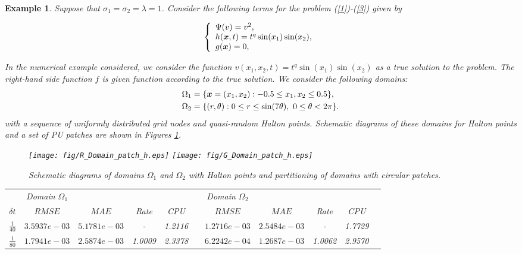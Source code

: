 \documentclass[9pt]{article}
\newtheorem{example}[theorem]{Example}
\numberwithin{equation}{section}
\def\bfm#1{\protect{\makebox{\boldmath $#1$}}}
\def\x {\bfm{x}}
\begin{document}
\begin{example}
Suppose that $\sigma_1=\sigma_2=\lambda=1$. Consider the following terms for the problem (\ref{1})-(\ref{3}) given by
\begin{small}
\begin{eqnarray}%
\left\{ {\begin{array}{ll}
\Psi(v)=v^2,\\
h(\x,t)=t^{q}\sin(x_1)\sin(x_2),\\
g(\x)=0,
\end{array} } \right.\nonumber
 \end{eqnarray}
 \end{small}
In the numerical example considered, we consider the function $v(x_1,x_2,t)=t^{q}\sin(x_1)\sin(x_2)$ as a true solution to the problem. The right-hand side function $f$ is given function according to the true solution. We consider the following domains:
\begin{align*}\label{D1}
\Omega_{1}&=\lbrace \x=(x_{1},x_{2}):-0.5\leq x_{1},x_{2}\leq 0.5\rbrace,\\
\Omega_{2}&=\lbrace (r,\theta):0\leq r\leq \sin (7\theta), ~0 \leq \theta <2\pi\rbrace.\nonumber
\end{align*}
with a sequence of uniformly distributed grid nodes and quasi-random Halton points.
Schematic diagrams of these domains for Halton points and a set of PU patches are shown in Figures \ref{fig_dom}.
\begin{figure}[!h]
\centering
\texttt{[image: fig/R\_Domain\_patch\_h.eps]}
\texttt{[image: fig/G\_Domain\_patch\_h.eps]}
\caption{Schematic diagrams of domains $\Omega_1$ and $\Omega_2$ with Halton points and partitioning of domains with circular patches.}\label{fig_dom}
\end{figure}
\begin{table}[!h]
\centering
\begin{tabular}{ c | c c c c c c c c c c}
  \hline
 &{Domain $\Omega_1$} & & & & & { Domain $\Omega_2$}& &&\\
  \cline{2-4} \cline{7-9}
{$\delta t$} & {$RMSE$} & {$MAE$} & {Rate}  & {CPU}&& {$RMSE$} & {$MAE$} & {Rate} & {CPU} \\ \hline
{$\frac{1}{40}$} & {$3.5937e-03$} & {$5.1781e-03$} & {-}  & {1.2116}&& {$1.2716e-03$} & {$2.5484e-03$} & {-}  & {1.7729}\\ 
{$\frac{1}{80}$} & {$1.7941e-03$} & {$2.5874e-03$} & {1.0009}  & {2.3378}&& {$6.2242e-04$} & {$1.2687e-03$} & {1.0062}  & {2.9570}\\ 

\end{tabular}
\end{table}
\end{example}
\end{document}
